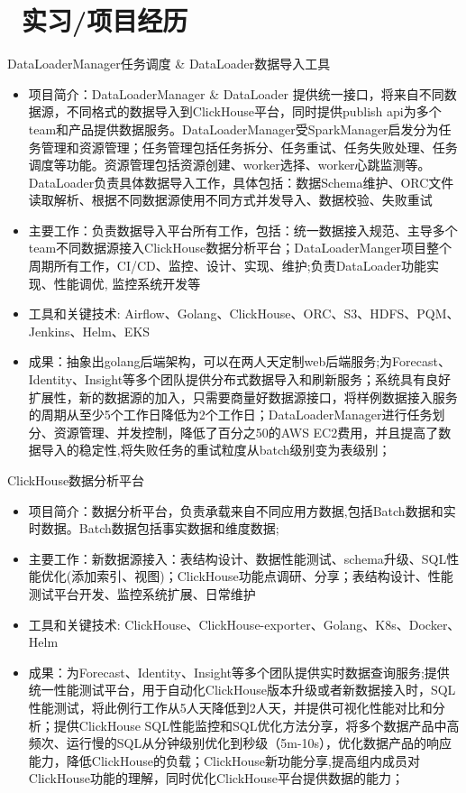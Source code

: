 \documentclass{resume}
\begin{document}
\section{\faUsers\ 实习/项目经历}
DataLoaderManager任务调度 \& DataLoader数据导入工具
\begin{itemize}
  \item 项目简介：DataLoaderManager \& DataLoader 提供统一接口，将来自不同数据源，不同格式的数据导入到ClickHouse平台，同时提供publish api为多个team和产品提供数据服务。DataLoaderManager受SparkManager启发分为任务管理和资源管理；任务管理包括任务拆分、任务重试、任务失败处理、任务调度等功能。资源管理包括资源创建、worker选择、worker心跳监测等。DataLoader负责具体数据导入工作，具体包括：数据Schema维护、ORC文件读取解析、根据不同数据源使用不同方式并发导入、数据校验、失败重试
  \item 主要工作：负责数据导入平台所有工作，包括：统一数据接入规范、主导多个team不同数据源接入ClickHouse数据分析平台；DataLoaderManger项目整个周期所有工作，CI/CD、监控、设计、实现、维护;负责DataLoader功能实现、性能调优, 监控系统开发等
  \item 工具和关键技术: Airflow、Golang、ClickHouse、ORC、S3、HDFS、PQM、Jenkins、Helm、EKS
  \item 成果：抽象出golang后端架构，可以在两人天定制web后端服务;为Forecast、Identity、Insight等多个团队提供分布式数据导入和刷新服务；系统具有良好扩展性，新的数据源的加入，只需要商量好数据源接口，将样例数据接入服务的周期从至少5个工作日降低为2个工作日；DataLoaderManager进行任务划分、资源管理、并发控制，降低了百分之50的AWS EC2费用，并且提高了数据导入的稳定性,将失败任务的重试粒度从batch级别变为表级别；
\end{itemize}
ClickHouse数据分析平台
\begin{itemize}
  \item 项目简介：数据分析平台，负责承载来自不同应用方数据,包括Batch数据和实时数据。Batch数据包括事实数据和维度数据;
  \item 主要工作：新数据源接入：表结构设计、数据性能测试、schema升级、SQL性能优化(添加索引、视图)；ClickHouse功能点调研、分享；表结构设计、性能测试平台开发、监控系统扩展、日常维护
  \item 工具和关键技术: ClickHouse、ClickHouse-exporter、Golang、K8s、Docker、Helm
  \item 成果：为Forecast、Identity、Insight等多个团队提供实时数据查询服务;提供统一性能测试平台，用于自动化ClickHouse版本升级或者新数据接入时，SQL性能测试，将此例行工作从5人天降低到2人天，并提供可视化性能对比和分析；提供ClickHouse SQL性能监控和SQL优化方法分享，将多个数据产品中高频次、运行慢的SQL从分钟级别优化到秒级（5m-10s），优化数据产品的响应能力，降低ClickHouse的负载；ClickHouse新功能分享,提高组内成员对ClickHouse功能的理解，同时优化ClickHouse平台提供数据的能力；
\end{itemize}
\end{document}
